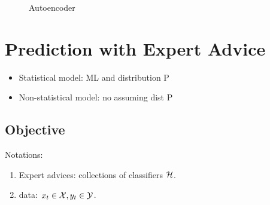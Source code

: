 \documentclass[a4paper]{report}
\begin{document}
\begin{figure}[!htp]
\centering
{}
\caption{Autoencoder}
\label{fig:autoencoder}
\end{figure}

\chapter{Prediction with Expert Advice}
\begin{itemize}
\item Statistical model: ML and distribution P
\item Non-statistical model: no assuming dist P
\end{itemize}

\section{Objective}
Notations:
\begin{enumerate}
\item Expert advices: collections of classifiers $\mathcal{H}$.
\item data: $x_t \in \mathcal{X}, y_t \in \mathcal{Y}$.
\end{enumerate}
\end{document}
